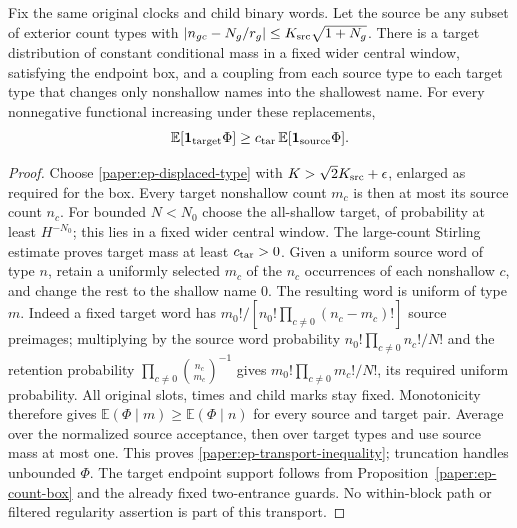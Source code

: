 \begin{lemma}\label{paper:ep-count-transport}
Fix the same original clocks and child binary words.  Let the source be
any subset of exterior count types with
$|n_{gc}-N_g/r_g|\leq K_{\rm src}\sqrt{1+N_g}$.
There is a target distribution of constant conditional mass in a fixed
wider central window, satisfying the endpoint box, and a coupling from
each source type to each target type that changes only nonshallow names
into the shallowest name.  For every nonnegative functional increasing
under these replacements,
\begin{equation}\label{paper:ep-transport-inequality}
 \mathbb E[\mathbf1_{\rm target}\Phi]
             \geq c_{\rm tar}\,
                         \mathbb E[\mathbf1_{\rm source}\Phi].
\end{equation}
\end{lemma}
\begin{proof}
Choose \eqref{paper:ep-displaced-type} with
$K>\sqrt2K_{\rm src}+\epsilon$, enlarged as required for the box.
Every target nonshallow count $m_c$ is then at most its source count
$n_c$.  For bounded $N<N_0$ choose the all-shallow target, of probability
at least $H^{-N_0}$; this lies in a fixed wider central window.
The large-count Stirling estimate proves target mass at least
$c_{\rm tar}>0$.
Given a uniform source word of type $n$, retain a uniformly selected
$m_c$ of the $n_c$ occurrences of each nonshallow $c$, and change the
rest to the shallow name $0$.  The resulting word is uniform of type
$m$.  Indeed a fixed target word has
$m_0!/[n_0!\prod_{c\ne0}(n_c-m_c)!]$ source preimages; multiplying
by the source word probability $n_0!\prod_{c\ne0}n_c!/N!$ and the
retention probability $\prod_{c\ne0}\binom{n_c}{m_c}^{-1}$ gives
$m_0!\prod_{c\ne0}m_c!/N!$, its required uniform probability.
All original slots, times and child marks stay fixed.
Monotonicity therefore gives
$\mathbb E(\Phi\mid m)\geq\mathbb E(\Phi\mid n)$ for every
source and target pair.  Average over the normalized source
acceptance, then over target types and use source mass at most one.
This proves \eqref{paper:ep-transport-inequality}; truncation handles
unbounded $\Phi$.  The target endpoint support follows from
Proposition~\ref{paper:ep-count-box} and the already fixed two-entrance
guards.  No within-block path or filtered regularity assertion is
part of this transport.
\end{proof}

